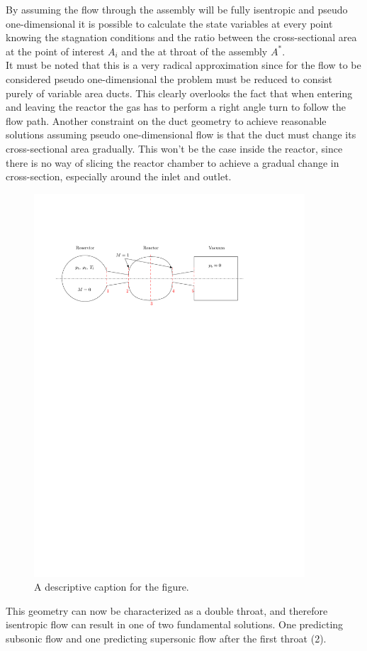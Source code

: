 	By assuming the flow through the assembly will be fully isentropic and pseudo one-dimensional it is possible to calculate the state variables at every point knowing the stagnation conditions and the ratio between the cross-sectional area at the point of interest $A_i$ and the at throat of the assembly $A^*$.\\
	It must be noted that this is a very radical approximation since for the flow to be  considered pseudo one-dimensional the problem must be reduced to consist purely of variable area ducts.
	This clearly overlooks the fact that when entering and leaving the reactor the gas has to perform a right angle turn to follow the flow path.
	Another constraint on the duct geometry to achieve reasonable solutions assuming pseudo one-dimensional flow is that the duct must change its cross-sectional area gradually.
	\cite{anderson2021modern}
	This won't be the case inside the reactor, since there is no way of slicing the reactor chamber to achieve a gradual change in cross-section, especially around the inlet and outlet.
	\begin{figure}[H]
	    \centering
	    \includegraphics[width=0.9\textwidth]{src/03_analytical-work/fig_1d-flow-geometry}
	    \caption{A descriptive caption for the figure.}
	\end{figure}
	This geometry can now be characterized as a double throat, and therefore isentropic flow can result in one of two fundamental solutions.
	One predicting subsonic flow and one predicting supersonic flow after the first throat (2).
	\cite{SALAS1986193, EMMONS1958}

